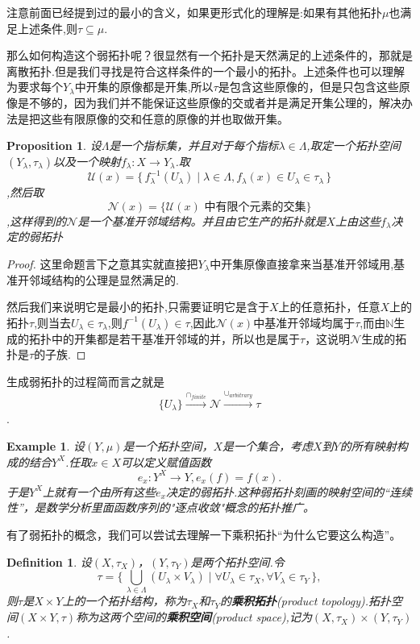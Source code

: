 \documentclass{article}
\newtheorem{proposition}[theorem]{Proposition}
\newtheorem{example}[theorem]{Example}
\newtheorem{definition}[theorem]{Definition}
\newcommand*{\xfunc}[4]{{#2}\colon{#3}{#1}{#4}}
\newcommand*{\func}[3]{\xfunc{\to}{#1}{#2}{#3}}
\newcommand\Set[2]{\{\,#1\mid#2\,\}} %
\begin{document}
注意前面已经提到过的最小的含义，如果更形式化的理解是:如果有其他拓扑$\mu$也满足上述条件,则$\tau \subseteq \mu$.

那么如何构造这个弱拓扑呢？很显然有一个拓扑是天然满足的上述条件的，那就是离散拓扑.但是我们寻找是符合这样条件的一个最小的拓扑。上述条件也可以理解为要求每个$Y_\lambda$中开集的原像都是开集,所以$\tau$是包含这些原像的，但是只包含这些原像是不够的，因为我们并不能保证这些原像的交或者并是满足开集公理的，解决办法是把这些有限原像的交和任意的原像的并也取做开集。

\begin{proposition}
设$\Lambda$是一个指标集，并且对于每个指标$\lambda \in \Lambda$,取定一个拓扑空间$(Y_\lambda,\tau_\lambda)$以及一个映射$\func{f_\lambda}{X}{Y_\lambda}$.取 \[\mathcal{U}(x)=\Set{f_{\lambda}^{-1}(U_\lambda)}{\lambda \in \Lambda,f_\lambda(x) \in U_\lambda \in \tau_\lambda}\],然后取\[\mathcal{N}(x)=\{\mathcal{U}(x)\text{ 中有限个元素的交集}\}\],这样得到的$\mathcal{N}$是一个基准开邻域结构。并且由它生产的拓扑就是$X$上由这些$f_\lambda$决定的弱拓扑
\end{proposition}

\begin{proof}
这里命题言下之意其实就直接把$Y_\lambda$中开集原像直接拿来当基准开邻域用,基准开邻域结构的公理是显然满足的.

然后我们来说明它是最小的拓扑,只需要证明它是含于$X$上的任意拓扑，任意$X$上的拓扑$\tau$,则当去$U_\lambda \in \tau_\lambda$,则$f^{-1}(U_\lambda) \in \tau$,因此$\mathcal{N}(x)$中基准开邻域均属于$\tau$,而由$\mathbb{N}$生成的拓扑中的开集都是若干基准开邻域的并，所以也是属于$\tau$，这说明$\mathcal{N}$生成的拓扑是$\tau$的子族.
\end{proof}

生成弱拓扑的过程简而言之就是\[\{U_\lambda\}\stackrel{\cap_{finite}}\longrightarrow \mathcal{N}\stackrel{\cup_{arbitrary}}\longrightarrow \tau\].


\begin{example}
设$(Y,\mu)$是一个拓扑空间，$X$是一个集合，考虑$X$到$Y$的所有映射构成的结合$Y^X$.任取$x \in X$可以定义赋值函数\[\func{e_x}{Y^{X}}{Y}, e_x(f)=f(x).\]于是$Y^{X}$上就有一个由所有这些$e_x$决定的弱拓扑.这种弱拓扑刻画的映射空间的“连续性”，是数学分析里面函数序列的"逐点收敛"概念的拓扑推广。
\end{example}

有了弱拓扑的概念，我们可以尝试去理解一下乘积拓扑“为什么它要这么构造”。


\begin{definition}
设$(X,\tau_X)$，$(Y,\tau_Y)$是两个拓扑空间.令\[\tau = \Set{\bigcup\limits_{\lambda \in \Lambda}(U_\lambda \times V_\lambda)}{\forall U_\lambda \in \tau_X, \forall V_\lambda \in \tau_Y},\]则$\tau$是$X \times Y$上的一个拓扑结构，称为$\tau_X$和$\tau_Y$的\textbf{乘积拓扑}(product topology).拓扑空间$(X \times Y,\tau)$称为这两个空间的\textbf{乘积空间}(product space),记为$(X,\tau_X) \times (Y,\tau_Y)$.
\end{definition}
\end{document}
